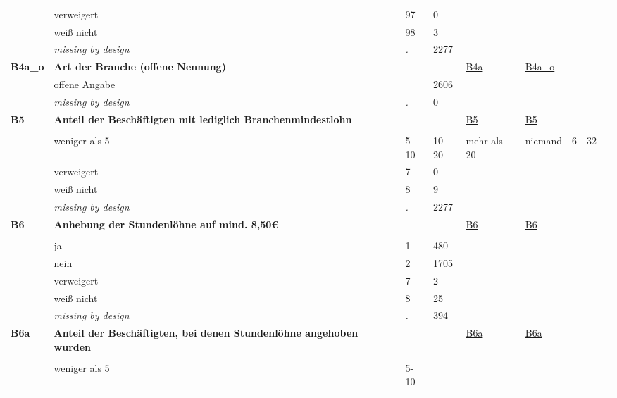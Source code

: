 \begin{longtable}{| L{2.45cm} | L{6cm} | C{1.5cm} | R{1cm} | C{2.25cm} | C{2.25cm} |}
   & verweigert & 97 & 0 &  &  \\ 
   & weiß nicht & 98 & 3 &  &  \\ 
   & \textit{missing by design} & \textit{.} & 2277 &  &  \\ 
   \midrule
\textbf{B4a\_o}\label{var:B4a:o} & \textbf{Art der Branche (offene Nennung)} &  &  & \hyperref[B4a]{B4a} & \hyperref[var:suf:B4a:o]{B4a\_o} \\ 
   & offene Angabe &  & 2606 &  &  \\ 
   & \textit{missing by design} & \textit{.} & 0 &  &  \\ 
   \midrule
\textbf{B5}\label{var:B5} & \textbf{Anteil der Beschäftigten mit lediglich Branchenmindestlohn} &  &  & \hyperref[B5]{B5} & \hyperref[var:suf:B5]{B5} \\ 
   &  &  &  &  &  \\ 
   & weniger als 5%
   & 5-10%
   & 10-20%
   & mehr als 20%
   & niemand & 6 & 32 &  &  \\ 
   & verweigert & 7 & 0 &  &  \\ 
   & weiß nicht & 8 & 9 &  &  \\ 
   & \textit{missing by design} & \textit{.} & 2277 &  &  \\ 
   \midrule
\textbf{B6}\label{var:B6} & \textbf{Anhebung der Stundenlöhne auf mind. 8,50€} &  &  & \hyperref[B6]{B6} & \hyperref[var:suf:B6]{B6} \\ 
   &  &  &  &  &  \\ 
   & ja & 1 & 480 &  &  \\ 
   & nein & 2 & 1705 &  &  \\ 
   & verweigert & 7 & 2 &  &  \\ 
   & weiß nicht & 8 & 25 &  &  \\ 
   & \textit{missing by design} & \textit{.} & 394 &  &  \\ 
   \midrule
\textbf{B6a}\label{var:B6a} & \textbf{Anteil der Beschäftigten, bei denen Stundenlöhne angehoben wurden} &  &  & \hyperref[B6a]{B6a} & \hyperref[var:suf:B6a]{B6a} \\ 
   &  &  &  &  &  \\ 
   & weniger als 5%
   & 5-10%

\end{longtable}
